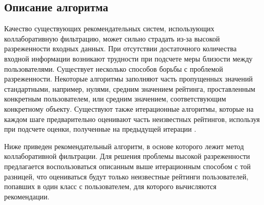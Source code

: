 \documentclass[a4paper, 12pt]{article} %
\begin{document}
\subsection{Описание алгоритма}
Качество существующих рекомендательных систем, использующих коллаборативную фильтрацию, может сильно страдать из-за высокой разреженности входных данных. При отсутствии достаточного количества входной информации возникают трудности при подсчете меры близости между пользователями. Существует несколько способов борьбы с проблемой разреженности. Некоторые алгоритмы заполняют часть пропущенных значений стандартными, например, нулями, средним значением рейтинга, проставленным конкретным пользователем, или средним значением, соответствующим конкретному объекту. Существуют также итерационные алгоритмы, которые на каждом шаге предварительно оценивают часть неизвестных рейтингов, используя при подсчете оценки, полученные на предыдущей итерации\cite{itercf} . 
\par
Ниже приведен рекомендательный алгоритм, в основе которого лежит метод коллаборативной фильтрации. Для решения проблемы высокой разреженности предлагается воспользоваться описанным выше итерационным способом с той разницей, что оцениваться будут только неизвестные рейтинги пользователей, попавших в один класс с пользователем, для которого вычисляются рекомендации.  
\end{document}
